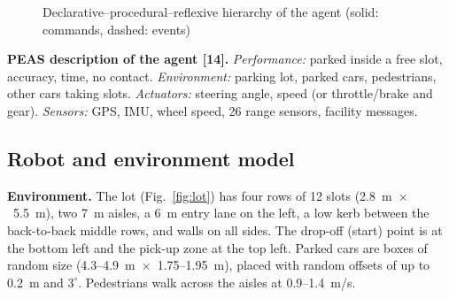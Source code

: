 \documentclass[12pt,a4paper]{article}
\begin{document}
\begin{figure}[!htbp]
\centering
{}
\caption{Declarative--procedural--reflexive hierarchy of the agent (solid: commands, dashed: events)}
\label{fig:layers}
\end{figure}

\textbf{PEAS description of the agent [14].} \emph{Performance:} parked inside a free slot, accuracy, time, no contact. \emph{Environment:} parking lot, parked cars, pedestrians, other cars taking slots. \emph{Actuators:} steering angle, speed (or throttle/brake and gear). \emph{Sensors:} GPS, IMU, wheel speed, 26 range sensors, facility messages.

\subsection{Robot and environment model}
\textbf{Environment.} The lot (Fig.~\ref{fig:lot}) has four rows of 12 slots (2.8~m~$\times$~5.5~m), two 7~m aisles, a 6~m entry lane on the left, a low kerb between the back-to-back middle rows, and walls on all sides. The drop-off (start) point is at the bottom left and the pick-up zone at the top left. Parked cars are boxes of random size (4.3--4.9~m~$\times$~1.75--1.95~m), placed with random offsets of up to 0.2~m and $3^\circ$. Pedestrians walk across the aisles at 0.9--1.4~m/s.
\end{document}
